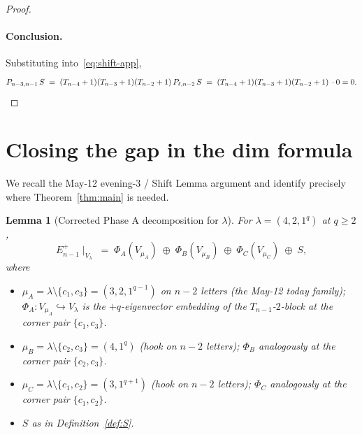 \documentclass[11pt]{article}
\newtheorem{lemma}[theorem]{Lemma}
\theoremstyle{definition}
\begin{document}
\begin{proof}
\paragraph{Conclusion.} Substituting into~\eqref{eq:shift-app},
\[
   P_{n-3, n-1}\,S
   \;=\; (T_{n-4}+1)(T_{n-3}+1)(T_{n-2}+1)\,P_{\ell, n-2}\,S
   \;=\; (T_{n-4}+1)(T_{n-3}+1)(T_{n-2}+1)\,\cdot 0 = 0. \qedhere
\]
\end{proof}

\section{Closing the gap in the dim formula}\label{sec:gap}

We recall the May-12 evening-3 / Shift Lemma argument and identify
precisely where Theorem~\ref{thm:main} is needed.

\begin{lemma}[Corrected Phase A decomposition for $\lambda$]\label{lem:E-decomp}
For $\lambda = (4, 2, 1^q)$ at $q \ge 2$,
\begin{equation}\label{eq:E-decomp}
   E_{n-1}^+\!\mid_{V_\lambda}
   \;=\;
   \Phi_A(V_{\mu_A})\;\oplus\;\Phi_B(V_{\mu_B})\;\oplus\;\Phi_C(V_{\mu_C})\;\oplus\;S,
\end{equation}
where
\begin{itemize}[leftmargin=2em,topsep=0.2em,itemsep=0.1em]
\item $\mu_A = \lambda \setminus \{c_1, c_3\} = (3, 2, 1^{q-1})$ on
$n - 2$ letters (the May-12 today family); $\Phi_A: V_{\mu_A}
\hookrightarrow V_\lambda$ is the $+q$-eigenvector embedding of the
$T_{n-1}$-$2$-block at the corner pair $\{c_1, c_3\}$.
\item $\mu_B = \lambda \setminus \{c_2, c_3\} = (4, 1^{q})$ (hook on
$n - 2$ letters); $\Phi_B$ analogously at the corner pair
$\{c_2, c_3\}$.
\item $\mu_C = \lambda \setminus \{c_1, c_2\} = (3, 1^{q+1})$ (hook
on $n - 2$ letters); $\Phi_C$ analogously at the corner pair
$\{c_1, c_2\}$.
\item $S$ as in Definition~\ref{def:S}.
\end{itemize}
\end{lemma}
\end{document}
